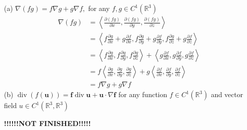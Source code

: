 \documentclass{article}
\begin{document}
(a) $\nabla(f g) = f \nabla g + g \nabla f,$ for any
$f, g \in C^{1}\left(\mathbb{R}^{3}\right)$
%
\begin{align*}
    \nabla (f g)
        &= \left\langle
                \frac{\partial (f g)}{\partial x},
                \frac{\partial (f g)}{\partial y},
                \frac{\partial (f g)}{\partial z}
           \right\rangle \\
        &= \left\langle
                f \frac{\partial g}{\partial x} + g \frac{\partial f}{\partial x},
                f \frac{\partial g}{\partial y} + g \frac{\partial f}{\partial y},
                f \frac{\partial g}{\partial z} + g \frac{\partial f}{\partial z}
           \right\rangle \\
        &= \left\langle
                f \frac{\partial g}{\partial x},
                f \frac{\partial g}{\partial y},
                f \frac{\partial g}{\partial z}
           \right\rangle
           +
           \left\langle
                g \frac{\partial f}{\partial x},
                g \frac{\partial f}{\partial y},
                g \frac{\partial f}{\partial z}
           \right\rangle \\
        &= f \left\langle
                \frac{\partial g}{\partial x},
                \frac{\partial g}{\partial y},
                \frac{\partial g}{\partial z}
           \right\rangle
           +
           g \left\langle
                \frac{\partial f}{\partial x},
                \frac{\partial f}{\partial y},
                \frac{\partial f}{\partial z}
           \right\rangle \\
        &= f \nabla g + g \nabla f
\end{align*}
%
(b) $\operatorname{div}(f (\mathbf{u})) = \mathbf{f} \operatorname{div} \mathbf{u} + \mathbf{u} \cdot \nabla \mathbf{f}$
for any function $f \in C^{1}\left(\mathbb{R}^{3}\right)$ and vector field
$u \in C^{1}\left(\mathbb{R}^{3}, \mathbb{R}^{3}\right)$

\quad \textbf{!!!!!!NOT FINISHED!!!!!}
\end{document}
